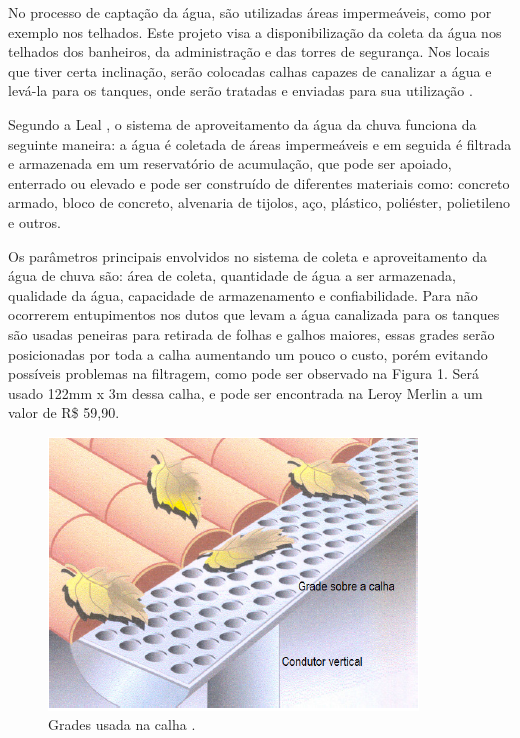 No processo de captação da água, são utilizadas áreas impermeáveis, como por exemplo nos telhados. Este projeto visa a disponibilização da coleta da água nos telhados dos banheiros, da administração e das torres de segurança. Nos locais que tiver certa inclinação, serão colocadas calhas capazes de canalizar a água e levá-la para os tanques, onde serão tratadas e enviadas para sua utilização \cite{MAY}.

Segundo a Leal \cite{LEAL} , o sistema de aproveitamento da água da chuva funciona da seguinte maneira: a água é coletada de áreas impermeáveis e em seguida é filtrada e armazenada em um reservatório de acumulação, que pode ser apoiado, enterrado ou elevado e pode ser construído de diferentes materiais como: concreto armado, bloco de concreto, alvenaria de tijolos, aço, plástico, poliéster, polietileno e outros. 

Os parâmetros principais envolvidos no sistema de coleta e aproveitamento da água de chuva são: área de coleta, quantidade de água a ser armazenada, qualidade da água, capacidade de armazenamento e confiabilidade. 
Para não ocorrerem entupimentos nos dutos que levam a água canalizada para os tanques são usadas peneiras para retirada de folhas e galhos maiores, essas grades serão posicionadas por toda a calha aumentando um pouco o custo, porém evitando possíveis problemas na filtragem, como pode ser observado na Figura 1. Será usado 122mm x 3m dessa calha, e pode ser encontrada na  Leroy Merlin a um valor de R\$ 59,90.

\begin{figure}[H]
	 \centering
	\label{Grades usada na calha.}
	 \includegraphics[scale=0.6]{captacao/5.png}
	 \caption{Grades usada na calha \cite{WATERFALL}.}
\end{figure}

